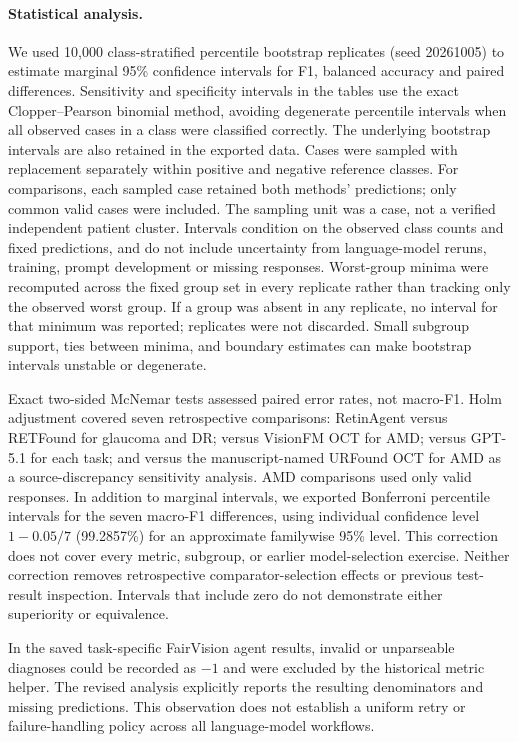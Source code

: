 \paragraph{Statistical analysis.}
We used 10,000 class-stratified percentile bootstrap replicates (seed 20261005)
to estimate marginal 95\% confidence intervals for F1, balanced accuracy and
paired differences. Sensitivity and specificity intervals in the tables use
the exact Clopper--Pearson binomial method, avoiding degenerate percentile
intervals when all observed cases in a class were classified correctly.
The underlying bootstrap intervals are also retained in the exported data.
Cases were sampled with
replacement separately within positive and negative reference classes.
For comparisons, each sampled case retained both methods' predictions;
only common valid cases were included. The sampling unit was a case, not
a verified independent patient cluster. Intervals condition on the observed
class counts and fixed predictions, and do not include uncertainty from
language-model reruns, training, prompt development or missing responses.
Worst-group minima were recomputed across the fixed group set in every
replicate rather than tracking only the observed worst group. If a group
was absent in any replicate, no interval for that minimum was reported;
replicates were not discarded. Small subgroup support, ties between minima,
and boundary estimates can make bootstrap intervals unstable or degenerate.

Exact two-sided McNemar tests assessed paired error rates, not macro-F1.
Holm adjustment covered seven retrospective comparisons: RetinAgent versus
RETFound for glaucoma and DR; versus VisionFM OCT for AMD; versus GPT-5.1
for each task; and versus the manuscript-named URFound OCT for AMD as a
source-discrepancy sensitivity analysis. AMD comparisons used only valid
responses. In addition to marginal intervals, we exported Bonferroni
percentile intervals for the seven macro-F1 differences, using individual
confidence level $1-0.05/7$ (99.2857\%) for an approximate familywise 95\%
level. This correction does not cover every metric, subgroup, or earlier
model-selection exercise. Neither correction removes retrospective
comparator-selection effects or previous test-result inspection. Intervals
that include zero do not demonstrate either superiority or equivalence.

In the saved task-specific FairVision agent results, invalid or unparseable
diagnoses could be recorded as $-1$ and were excluded by the historical metric
helper. The revised analysis explicitly reports the resulting denominators
and missing predictions. This observation does not establish a uniform
retry or failure-handling policy across all language-model workflows.
